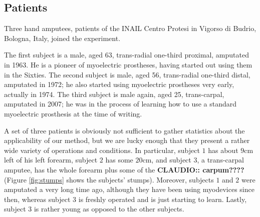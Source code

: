 \subsection{Patients}

Three hand amputees, patients of the INAIL Centro Protesi in Vigorso
di Budrio, Bologna, Italy, joined the experiment.

The first subject is a male, aged 63, trans-radial one-third proximal,
amputated in 1963. He is a pioneer of myoelectric prostheses, having
started out using them in the Sixties. The second subject is male,
aged 56, trans-radial one-third distal, amputated in 1972; he also
started using myoelectric prostheses very early, actually in 1974. The
third subject is male again, aged 25, trans-carpal, amputated in 2007;
he was in the process of learning how to use a standard myoelectric
prosthesis at the time of writing.

A set of three patients is obviously not sufficient to gather
statistics about the applicability of our method, but we are lucky
enough that they present a rather wide variety of operations and
conditions. In particular, subject $1$ has about $9$cm left of his
left forearm, subject $2$ has some $20$cm, and subject $3$, a
trans-carpal amputee, has the whole forearm plus some of the
\textbf{CLAUDIO:: carpum????} (Figure \ref{fig:stumps} shows the subjects'
stumps). Moreover, subjects $1$ and $2$ were amputated a very long
time ago, although they have been using myodevices since then, whereas
subject $3$ is freshly operated and is just starting to learn. Lastly,
subject $3$ is rather young as opposed to the other subjects.

